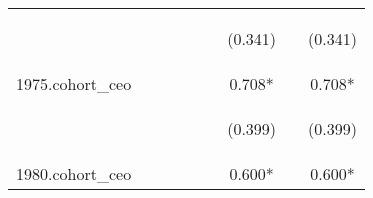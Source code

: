 \begin{center}
\begin{tabular}{lcccccccc}
\vspace{4pt} & \begin{footnotesize}\end{footnotesize} & \begin{footnotesize}\end{footnotesize} & \begin{footnotesize}\end{footnotesize} & \begin{footnotesize}\end{footnotesize} & \begin{footnotesize}\end{footnotesize} & \begin{footnotesize}(0.341)\end{footnotesize} & \begin{footnotesize}\end{footnotesize} & \begin{footnotesize}(0.341)\end{footnotesize} \\
1975.cohort\_ceo &  &  &  &  &  & 0.708* &  & 0.708* \\
\vspace{4pt} & \begin{footnotesize}\end{footnotesize} & \begin{footnotesize}\end{footnotesize} & \begin{footnotesize}\end{footnotesize} & \begin{footnotesize}\end{footnotesize} & \begin{footnotesize}\end{footnotesize} & \begin{footnotesize}(0.399)\end{footnotesize} & \begin{footnotesize}\end{footnotesize} & \begin{footnotesize}(0.399)\end{footnotesize} \\
1980.cohort\_ceo &  &  &  &  &  & 0.600* &  & 0.600* \\

\end{tabular}
\end{center}
